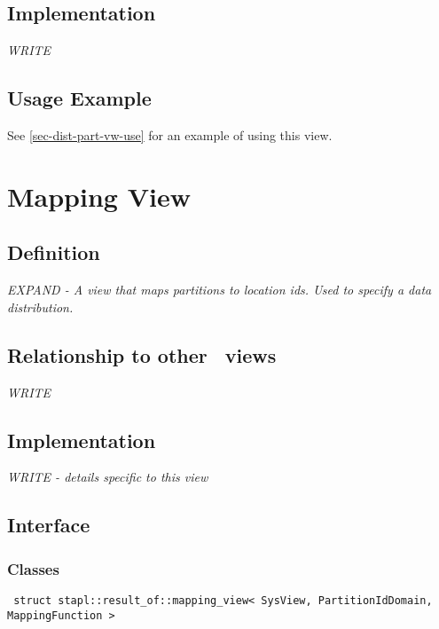 \subsection{Implementation} \label{sec-dist-sys-vw-impl}

\textit{WRITE}

\subsection{Usage Example} 

See \ref{sec-dist-part-vw-use} for an example of using this view.


\section{Mapping View} \label{sec-dist-map-vw}

\subsection{Definition}

\textit{EXPAND - A view that maps partitions to location ids.  Used to specify a data distribution.}

\subsection{Relationship to other \stapl\ views}

\textit{WRITE}

\subsection{Implementation}

\textit{WRITE - details specific to this view}

\subsection{Interface} \label{sec-dist-map-vw-inter}

\subsubsection{Classes}

\noindent
\texttt{%
struct stapl::result\_of::mapping\_view< SysView,
PartitionIdDomain, MappingFunction >
}

